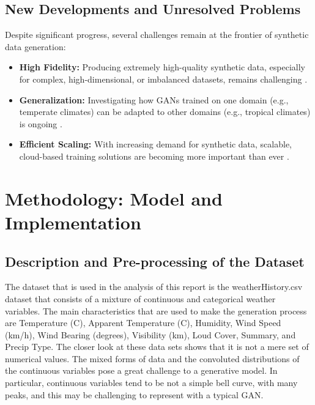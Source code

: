 \documentclass[12pt, draftclsnofoot, onecolumn]{IEEEtran}
\begin{document}
\subsection{New Developments and Unresolved Problems}
Despite significant progress, several challenges remain at the frontier of synthetic data generation:

\begin{itemize}
    \item \textbf{High Fidelity:} Producing extremely high-quality synthetic data, especially for complex, high-dimensional, or imbalanced datasets, remains challenging \cite{ref6,ref17}.
    
    \item \textbf{Generalization:} Investigating how GANs trained on one domain (e.g., temperate climates) can be adapted to other domains (e.g., tropical climates) is ongoing \cite{ref11,ref20}.
    
    \item \textbf{Efficient Scaling:} With increasing demand for synthetic data, scalable, cloud-based training solutions are becoming more important than ever \cite{ref4,ref14}.
\end{itemize}



\section{Methodology: Model and Implementation}

\subsection{Description and Pre-processing of the Dataset}
The dataset that is used in the analysis of this report is the weatherHistory.csv \cite{ref25} dataset that consists of a mixture of continuous and categorical weather variables. The main characteristics that are used to make the generation process are Temperature (C), Apparent Temperature (C), Humidity, Wind Speed (km/h), Wind Bearing (degrees), Visibility (km), Loud Cover, Summary, and Precip Type. The closer look at these data sets shows that it is not a mere set of numerical values. The mixed forms of data and the convoluted distributions of the continuous variables pose a great challenge to a generative model. In particular, continuous variables tend to be not a simple bell curve, with many peaks, and this may be challenging to represent with a typical GAN.  
\end{document}
